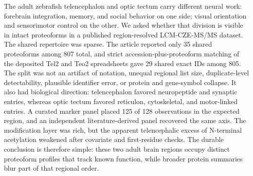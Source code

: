 The adult zebrafish telencephalon and optic tectum carry different neural work: forebrain integration, memory, and social behavior on one side; visual orientation and sensorimotor control on the other. We asked whether that division is visible in intact proteoforms in a published region-resolved LCM-CZE-MS/MS dataset. The shared repertoire was sparse. The article reported only 35 shared proteoforms among 807 total, and strict accession-plus-proteoform matching of the deposited Tel2 and Teo2 spreadsheets gave 29 shared exact IDs among 805. The split was not an artifact of notation, unequal regional list size, duplicate-level detectability, plausible identifier error, or protein and gene-symbol collapse. It also had biological direction: telencephalon favored neuropeptide and synaptic entries, whereas optic tectum favored reticulon, cytoskeletal, and motor-linked entries. A curated marker panel placed 125 of 128 observations in the expected region, and an independent literature-derived panel recovered the same axis. The modification layer was rich, but the apparent telencephalic excess of N-terminal acetylation weakened after covariate and first-residue checks. The durable conclusion is therefore simple: these two adult brain regions occupy distinct proteoform profiles that track known function, while broader protein summaries blur part of that regional order.
